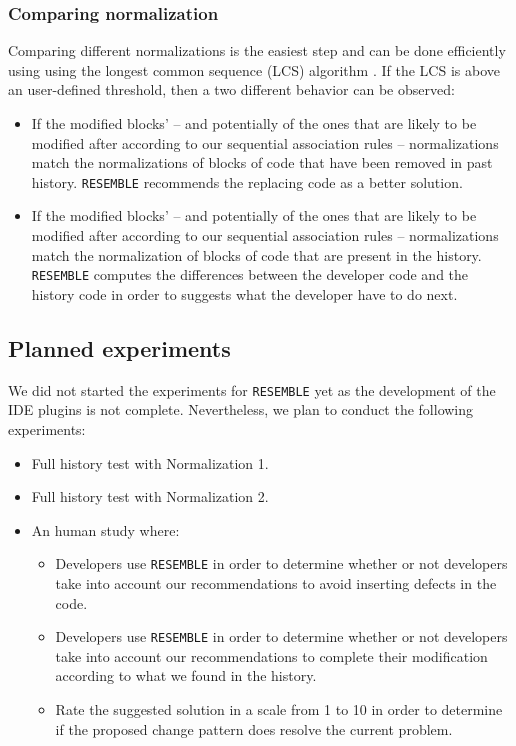 \subsubsection{Comparing normalization\label{sec:resemble-comparing}}

Comparing different normalizations is the easiest step and can be done efficiently using using the longest common sequence (LCS) algorithm \cite{hirschberg1977algorithms}.
If the LCS is above an user-defined threshold, then a two different behavior can be observed:

\begin{itemize}
	\item If the modified blocks' -- and potentially of the ones that are likely to be modified after according to our sequential association rules -- normalizations match the normalizations of blocks of code that have been removed in past history. {\tt RESEMBLE} recommends the replacing code as a better solution.
	\item If the modified blocks' -- and potentially of the ones that are likely to be modified after according to our sequential association rules -- normalizations match the normalization of blocks of code that are present in the history. {\tt RESEMBLE} computes the differences between the developer code and the history code in order to suggests what the developer have to do next.
\end{itemize}

\subsection{Planned experiments}

We did not started the experiments for {\tt RESEMBLE} yet as the development of the IDE plugins is not complete. Nevertheless, we plan to conduct the following experiments:

\begin{itemize}
	\item Full history test with Normalization 1.
	\item Full history test with Normalization 2.
	\item An human study where:
	\begin{itemize}
		\item Developers use {\tt RESEMBLE} in order to determine whether or not developers take into account our recommendations to avoid inserting defects in the code.
		\item Developers use {\tt RESEMBLE} in order to determine whether or not developers take into account our recommendations to complete their modification according to what we found in the history.
		\item Rate the suggested solution in a scale from 1 to 10 in order to determine if the proposed change pattern does resolve the current problem.
	\end{itemize}
\end{itemize}

